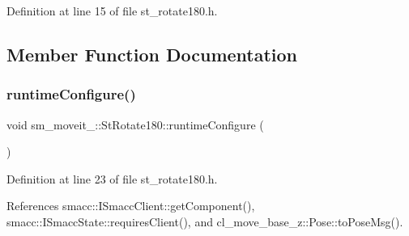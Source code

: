 Definition at line 15 of file st\+\_\+rotate180.\+h.



\subsection{Member Function Documentation}
\mbox{\label{structsm__moveit__2_1_1StRotate180_a4c99c3cc7db072a3280fc7cd02e09f99}} 
\subsubsection{\texorpdfstring{runtime\+Configure()}{runtimeConfigure()}}
{\footnotesize\ttfamily void sm\+\_\+moveit\+\_\+::\+St\+Rotate180\+::runtime\+Configure (\begin{DoxyParamCaption}{ }\end{DoxyParamCaption})\hspace{0.3cm}{\ttfamily [inline]}}



Definition at line 23 of file st\+\_\+rotate180.\+h.



References smacc\+::\+I\+Smacc\+Client\+::get\+Component(), smacc\+::\+I\+Smacc\+State\+::requires\+Client(), and cl\+\_\+move\+\_\+base\+\_\+z\+::\+Pose\+::to\+Pose\+Msg().


